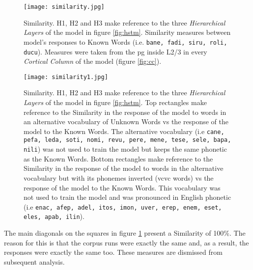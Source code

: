 \documentclass[11pt,a4paper]{article}
\begin{document}
\begin{figure}[h]
\centering
\texttt{[image: similarity.jpg]}
\caption{\scriptsize{Similarity. H1, H2 and H3 make reference to the three \textit{Hierarchical Layers} of the model
in figure \ref{fig:hstm}. Similarity measures between model's responses to
Known Words (i.e. \texttt{bane, fadi, siru, roli, ducu}).
Measures were taken from the \ac{pg} inside L2/3 in every
\textit{Cortical Column} of the model (figure \ref{fig:cc}).}}
\label{fig:similarity}
\end{figure}

\begin{figure}[h]
\centering
\texttt{[image: similarity1.jpg]}
\caption{\scriptsize{Similarity. H1, H2 and H3 make reference to the three \textit{Hierarchical Layers} of the model
in figure \ref{fig:hstm}.
Top rectangles make reference to the Similarity in the response of the model to words in
an alternative vocabulary of Unknown Words vs the response of the model to the Known Words.
The alternative vocabulary (i.e \texttt{cane, pefa, leda, soti, nomi, revu, pere, mene, tese, sele, bapa, nili})
was not used to train the model but keeps the same phonetic as the Known Words.
Bottom rectangles make reference to the Similarity in the response of the model to words in the
alternative vocabulary but with its phonemes inverted (\ac{vcvc} words)
vs the response of the model to the Known Words.
This vocabulary was not used to train the model and was pronounced in English phonetic
(i.e \texttt{enac, afep, adel, itos, imon, uver, erep, enem, eset, eles, apab, ilin}).}}
\label{fig:similarity1}
\end{figure}

The main diagonals on the squares in figure \ref{fig:similarity} present a Similarity of 100\%.
The reason for this is that the corpus runs were exactly the same and, as a result,
the responses were exactly the same too.
These measures are dismissed from subsequent analysis.\\
\end{document}
